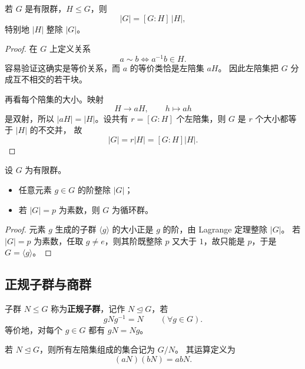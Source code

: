 \begin{theorem}[Lagrange 定理]
若 $G$ 是有限群，$H\le G$，则
\begin{equation}
  |G|=[G:H]\,|H|,
\end{equation}
特别地 $|H|$ 整除 $|G|$。
\end{theorem}

\begin{proof}
在 $G$ 上定义关系
\[
  a\sim b \iff a^{-1}b\in H.
\]
容易验证这确实是等价关系，而 $a$ 的等价类恰是左陪集 $aH$。
因此左陪集把 $G$ 分成互不相交的若干块。

再看每个陪集的大小。映射
\[
  H\to aH,
  \qquad h\mapsto ah
\]
是双射，所以 $|aH|=|H|$。设共有 $r=[G:H]$ 个左陪集，则 $G$ 是 $r$ 个大小都等于 $|H|$ 的不交并，
故
\[
  |G|=r|H|=[G:H]|H|.
\]
\end{proof}

\begin{corollary}
设 $G$ 为有限群。
\begin{itemize}
  \item 任意元素 $g\in G$ 的阶整除 $|G|$；
  \item 若 $|G|=p$ 为素数，则 $G$ 为循环群。
\end{itemize}
\end{corollary}

\begin{proof}
元素 $g$ 生成的子群 $\langle g\rangle$ 的大小正是 $g$ 的阶，由 Lagrange 定理整除 $|G|$。
若 $|G|=p$ 为素数，任取 $g\neq e$，则其阶既整除 $p$ 又大于 $1$，故只能是 $p$，于是
$G=\langle g\rangle$。
\end{proof}

\subsection{正规子群与商群}

\begin{definition}[正规子群]
子群 $N\le G$ 称为\textbf{正规子群}，记作 $N\trianglelefteq G$，若
\begin{equation}
  gNg^{-1}=N \qquad (\forall g\in G).
\end{equation}
等价地，对每个 $g\in G$ 都有 $gN=Ng$。
\end{definition}

\begin{definition}[商群]
若 $N\trianglelefteq G$，则所有左陪集组成的集合记为 $G/N$。
其运算定义为
\begin{equation}
  (aN)(bN)=abN.
\end{equation}
\end{definition}

